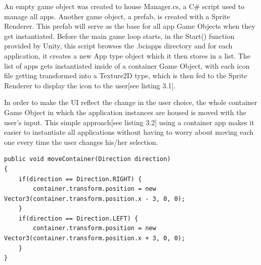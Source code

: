 An empty game object was created to house Manager.cs, a C\# script used to manage all apps. Another game object, a prefab, is created with a Sprite Renderer. This prefab will serve as the base for all app Game Objects when they get instantiated. 
\vspace{\baselineskip}\newline
Before the main game loop starts, in the Start() function provided by Unity, this script browses the .bciapps directory and for each application, it creates a new App type object which it then stores in a list. The list of apps gets instantiated inside of a container Game Object, with each icon file getting transformed into a Texture2D type, which is then fed to the Sprite Renderer to display the icon to the user[see listing 3.1].

In order to make the UI reflect the change in the user choice, the whole container Game Object in which the application instances are housed is moved with the user's input. This simple approach[see listing 3.2] using a container app makes it easier to instantiate all applications without having to worry about moving each one every time the user changes his/her selection.

\begin{lstlisting}[language={[Sharp]C}, caption={Manager.cs initialisation}, label={Script}]
public void moveContainer(Direction direction)
{
    if(direction == Direction.RIGHT) {
        container.transform.position = new Vector3(container.transform.position.x - 3, 0, 0);
    }
    if(direction == Direction.LEFT) {
        container.transform.position = new Vector3(container.transform.position.x + 3, 0, 0);
    }
}
\end{lstlisting}


